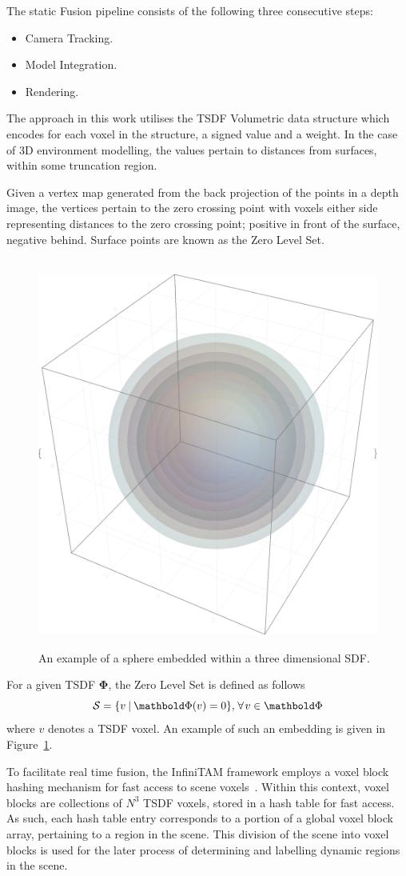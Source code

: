 The static Fusion pipeline consists of the following three consecutive steps:
\begin{itemize}
  \item Camera Tracking.
  \item Model Integration.
  \item Rendering.
\end{itemize}

The approach in this work utilises the TSDF Volumetric data structure which
encodes for each voxel in the structure, a signed value and a weight.
In the case of 3D environment modelling, the values pertain to distances from
surfaces, within some truncation region.

Given a vertex map generated from the back projection of the points in a depth
image, the vertices pertain to the zero crossing point with voxels either side
representing distances to the zero crossing point; positive in front of the
surface, negative behind. Surface points are known as the Zero Level Set.
\begin{figure}[!htbp]
~\label{fig:sdf_example}
  \centering
  \includegraphics[width=.5\linewidth]{figures/moseg/3d_sdf.eps}
  \caption[Signed Distance Function]{An example of a sphere embedded within a 
  three dimensional SDF.}
\end{figure}

For a given TSDF \(\bm{\Phi}\), the Zero Level Set is defined as follows
\begin{equation}
  \label{eqn:zero_level_definition}
  \mathcal{S} = \{v \given \bm{\Phi}(v) = 0\}, 
  \mkern2mu \forall \mkern2mu v \in \bm{\Phi}
\end{equation}
where \(v\) denotes a TSDF voxel. An example of such an embedding is given in
Figure~\ref{fig:sdf_example}.

To facilitate real time fusion, the InfiniTAM framework employs a voxel block
hashing mechanism for fast access to scene voxels~\cite{NieBner2013}. Within
this context, voxel blocks are collections of \(N^{3}\) TSDF voxels, stored in a 
hash table for fast access. As such, each hash table entry corresponds to a portion 
of a global voxel block array, pertaining to a region in the scene. This division 
of the scene into voxel blocks is used for the later process of determining and 
labelling dynamic regions in the scene.

